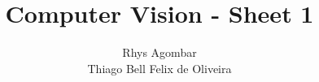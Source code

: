 \documentclass[11pt]{article}
\begin{document}
%
\author{
Rhys Agombar \\ 
Thiago Bell Felix de Oliveira
}
\title{Computer Vision - Sheet 1}
\maketitle



\end{document}
